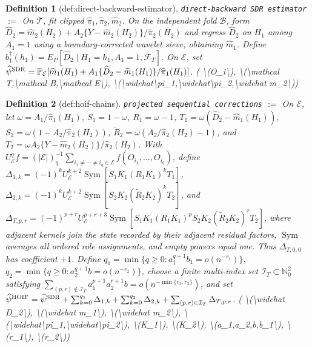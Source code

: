 \documentclass{article}
\newtheorem{definition}{Definition}
\begin{document}
\begin{definition}[def:direct-backward-estimator]\label{def:direct-backward-estimator}
\texttt{direct-backward SDR estimator} $:=$ On \(\mathcal T\), fit clipped \(\widehat\pi_1,\widehat\pi_2,\widehat m_2\). On the independent fold \(\mathcal B\), form \(\widehat D_2=\widehat m_2(H_2)+A_2\{Y-\widehat m_2(H_2)\}/\widehat\pi_2(H_2)\) and regress \(\widehat D_2\) on \(H_1\) among \(A_1=1\) using a boundary-corrected wavelet sieve, obtaining \(\widehat m_1\). Define \(b_1^\dagger(h_1)=E_P[\widehat D_2\mid H_1=h_1,A_1=1,\mathcal F_T]\). On \(\mathcal E\), set \(\widehat\psi^{\rm SDR}=\mathbb P_{\mathcal E}[\widehat m_1(H_1)+A_1\{\widehat D_2-\widehat m_1(H_1)\}/\widehat\pi_1(H_1)]\). \quad ( \textbackslash{}(O\_i\textbackslash{}), \textbackslash{}(\textbackslash{}mathcal T,\textbackslash{}mathcal B,\textbackslash{}mathcal E\textbackslash{}), \textbackslash{}(\textbackslash{}widehat\textbackslash{}pi\_1,\textbackslash{}widehat\textbackslash{}pi\_2,\textbackslash{}widehat m\_2\textbackslash{}))
\end{definition}

\begin{definition}[def:hoif-chains]\label{def:hoif-chains}
\texttt{projected sequential corrections} $:=$ On \(\mathcal E\), let \(\omega=A_1/\widehat\pi_1(H_1)\), \(S_1=1-\omega\), \(R_1=\omega-1\), \(T_1=\omega(\widehat D_2-\widehat m_1(H_1))\), \(S_2=\omega(1-A_2/\widehat\pi_2(H_2))\), \(\widetilde R_2=\omega(A_2/\widehat\pi_2(H_2)-1)\), and \(T_2=\omega A_2\{Y-\widehat m_2(H_2)\}/\widehat\pi_2(H_2)\). With \(U_{\mathcal E}^qf=(|\mathcal E|)_q^{-1}\sum_{i_1\ne\cdots\ne i_q\in\mathcal E}f(O_{i_1},\ldots,O_{i_q})\), define \(\Delta_{1,k}=(-1)^kU_{\mathcal E}^{k+2}\operatorname{Sym}[S_1K_1(R_1K_1)^kT_1]\), \(\Delta_{2,k}=(-1)^kU_{\mathcal E}^{k+2}\operatorname{Sym}[S_2K_2(\widetilde R_2K_2)^kT_2]\), and \(\Delta_{T,p,r}=(-1)^{p+r}U_{\mathcal E}^{p+r+3}\operatorname{Sym}[S_1K_1(R_1K_1)^pS_2K_2(\widetilde R_2K_2)^rT_2]\), where adjacent kernels join the state recorded by their adjacent residual factors, \(\operatorname{Sym}\) averages all ordered role assignments, and empty powers equal one. Thus \(\Delta_{T,0,0}\) has coefficient \(+1\). Define \(q_1=\min\{q\ge0:a_1^{q+1}b_1=o(n^{-r_1})\}\), \(q_2=\min\{q\ge0:a_2^{q+1}b=o(n^{-r_2})\}\), choose a finite multi-index set \(\mathcal I_T\subset\mathbb N_0^2\) satisfying \(\sum_{(p,r)\notin\mathcal I_T}a_1^{p+1}a_2^{r+1}b=o(n^{-\min\{r_1,r_2\}})\), and set \(\widehat\psi^{\rm HOIF}=\widehat\psi^{\rm SDR}+\sum_{k=0}^{q_1}\Delta_{1,k}+\sum_{k=0}^{q_2}\Delta_{2,k}+\sum_{(p,r)\in\mathcal I_T}\Delta_{T,p,r}\). \quad ( \textbackslash{}(\textbackslash{}widehat D\_2\textbackslash{}), \textbackslash{}(\textbackslash{}widehat m\_1\textbackslash{}), \textbackslash{}(\textbackslash{}widehat m\_2\textbackslash{}), \textbackslash{}(\textbackslash{}widehat\textbackslash{}pi\_1,\textbackslash{}widehat\textbackslash{}pi\_2\textbackslash{}), \textbackslash{}(K\_1\textbackslash{}), \textbackslash{}(K\_2\textbackslash{}), \textbackslash{}(a\_1,a\_2,b,b\_1\textbackslash{}), \textbackslash{}(r\_1\textbackslash{}), \textbackslash{}(r\_2\textbackslash{}))
\end{definition}
\end{document}
